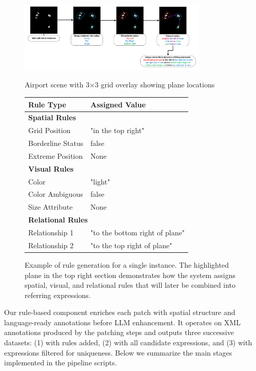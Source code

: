 \begin{figure}[H]
\centering
\begin{minipage}{0.5\textwidth}
\centering
\includegraphics[width=0.8\textwidth]{rule_based_generation.png}
\caption*{Airport scene with 3×3 grid overlay showing plane locations}
\end{minipage}%
\begin{minipage}{0.5\textwidth}
\centering
\footnotesize
\begin{tabular}{@{}ll@{}}
\toprule
\textbf{Rule Type} & \textbf{Assigned Value} \\
\midrule
\multicolumn{2}{l}{\textbf{Spatial Rules}} \\
Grid Position & "in the top right" \\
Borderline Status & false \\
Extreme Position & None \\
\midrule
\multicolumn{2}{l}{\textbf{Visual Rules}} \\
Color & "light" \\
Color Ambiguous & false \\
Size Attribute & None \\
\midrule
\multicolumn{2}{l}{\textbf{Relational Rules}} \\
Relationship 1 & "to the bottom right of plane" \\
Relationship 2 & "to the top right of plane" \\
\bottomrule
\end{tabular}
\end{minipage}
\caption{Example of rule generation for a single instance. The highlighted plane in the top right section demonstrates how the system assigns spatial, visual, and relational rules that will later be combined into referring expressions.}
\label{fig:rule_example}
\end{figure}

Our rule-based component enriches each patch with spatial structure and language-ready annotations before LLM enhancement. It operates on XML annotations produced by the patching steps and outputs three successive datasets: (1) with rules added, (2) with all candidate expressions, and (3) with expressions filtered for uniqueness. Below we summarize the main stages implemented in the pipeline scripts.

